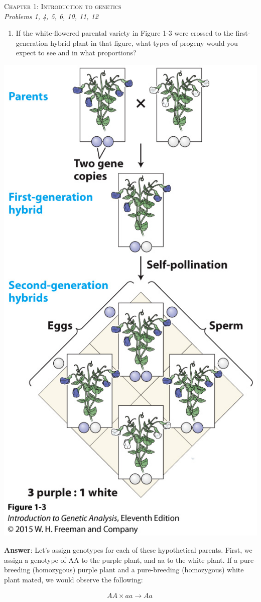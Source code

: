 \documentclass[11pt,]{article}
\providecommand{\tightlist}{%
  \setlength{\itemsep}{0pt}\setlength{\parskip}{0pt}}
\begin{document}
\begin{center}
\Large{\textsc{Chapter 1: Introduction to
genetics}}\\ \small{\textit{Problems 1, 4, 5, 6, 10, 11, 12}}\\
\vspace*{\baselineskip}
\end{center}

\begin{blackbox}

\begin{enumerate}
\def\labelenumi{\arabic{enumi}.}
\tightlist
\item
  If the white-flowered parental variety in Figure 1-3 were crossed to
  the first-generation hybrid plant in that figure, what types of
  progeny would you expect to see and in what proportions?
\end{enumerate}

\begin{center}\includegraphics[width=0.35\linewidth,]{input/figure_01_03} \end{center}

\vspace{10mm}

\textbf{Answer}: Let's assign genotypes for each of these hypothetical
parents. First, we assign a genotype of AA to the purple plant, and aa
to the white plant. If a pure-breeding (homozygous) purple plant and a
pure-breeding (homozygous) white plant mated, we would observe the
following:

\[\begin{aligned}
AA \times aa \rightarrow Aa ~
\end{aligned}\]


\end{blackbox}
\end{document}
